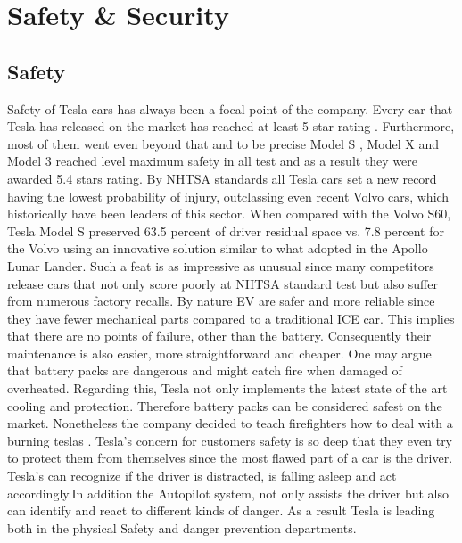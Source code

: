 \documentclass{article} %
\begin{document}




\section{Safety \& Security} %
\subsection{Safety}
Safety of Tesla cars has always been a focal point of the company.
Every car that Tesla has released on the market has reached at least 5 star rating \cite{Safety}. Furthermore, most of them went even beyond that and to be precise Model S \cite{ModelS-Rating} , Model X and Model 3 reached level maximum safety in all test and as a result they were awarded 5.4 stars rating. 
By NHTSA standards all Tesla cars set a new record having the lowest probability of injury, outclassing even recent Volvo cars, which historically have been leaders of this sector. When compared with the Volvo S60, Tesla Model S preserved 63.5 percent of driver residual space vs. 7.8 percent for the Volvo using an innovative solution similar to what adopted in the Apollo Lunar Lander.
Such a feat is as impressive as unusual since many competitors release cars that not only score poorly at NHTSA standard test but also suffer from  numerous factory recalls. 
\newline 
By nature EV are safer and more reliable since they have fewer mechanical parts compared to a traditional ICE car. This implies that there are no points of failure, other than the battery.
Consequently their maintenance is also easier, more straightforward and cheaper.
\newline One may argue that battery packs are dangerous and might catch fire when damaged of overheated. Regarding this, Tesla not only implements the latest state of the art cooling and protection. Therefore battery packs can be considered safest on the market. Nonetheless the company decided to teach firefighters how to deal with a burning teslas \cite{Tesla Training Fire}.
\newline Tesla's concern for customers safety is so deep that they even try to protect them from themselves since the most flawed part of a car is the driver.
\newline Tesla's can recognize if the driver is distracted, is falling asleep and act accordingly.In addition the Autopilot system,  not only assists the driver but also can identify and react to different kinds of danger.
\newline As a result Tesla is leading both in the physical Safety and danger prevention departments.
\end{document}
